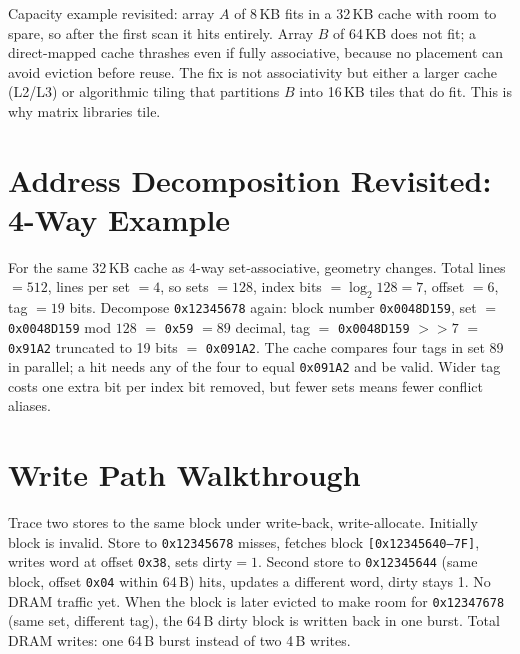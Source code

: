 Capacity example revisited: array $A$ of 8\,KB fits in a 32\,KB cache with room to spare, so after the first scan it hits entirely. Array $B$ of 64\,KB does not fit; a direct-mapped cache thrashes even if fully associative, because no placement can avoid eviction before reuse. The fix is not associativity but either a larger cache (L2/L3) or algorithmic tiling that partitions $B$ into 16\,KB tiles that do fit. This is why matrix libraries tile.

\section{Address Decomposition Revisited: 4-Way Example}
For the same 32\,KB cache as 4-way set-associative, geometry changes. Total lines $=512$, lines per set $=4$, so sets $=128$, index bits $=\log_2 128=7$, offset $=6$, tag $=19$ bits. Decompose \texttt{0x12345678} again: block number \texttt{0x0048D159}, set $=$ \texttt{0x0048D159} mod $128$ $=$ \texttt{0x59} $=89$ decimal, tag $=$ \texttt{0x0048D159} $>>7$ $=$ \texttt{0x91A2} truncated to 19 bits $=$ \texttt{0x091A2}. The cache compares four tags in set 89 in parallel; a hit needs any of the four to equal \texttt{0x091A2} and be valid. Wider tag costs one extra bit per index bit removed, but fewer sets means fewer conflict aliases.
\begin{center}
\end{center}

\section{Write Path Walkthrough}
Trace two stores to the same block under write-back, write-allocate. Initially block is invalid. Store to \texttt{0x12345678} misses, fetches block \texttt{[0x12345640--7F]}, writes word at offset \texttt{0x38}, sets dirty$=1$. Second store to \texttt{0x12345644} (same block, offset \texttt{0x04} within 64\,B) hits, updates a different word, dirty stays 1. No DRAM traffic yet. When the block is later evicted to make room for \texttt{0x12347678} (same set, different tag), the 64\,B dirty block is written back in one burst. Total DRAM writes: one 64\,B burst instead of two 4\,B writes.

